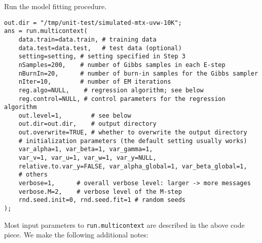 \documentclass[10pt]{article}
\begin{document}
Run the model fitting procedure.
{\small\begin{verbatim}
out.dir = "/tmp/unit-test/simulated-mtx-uvw-10K";
ans = run.multicontext(
    data.train=data.train, # training data
    data.test=data.test,   # test data (optional)
    setting=setting, # setting specified in Step 3
    nSamples=200,    # number of Gibbs samples in each E-step
    nBurnIn=20,      # number of burn-in samples for the Gibbs sampler
    nIter=10,        # number of EM iterations
    reg.algo=NULL,    # regression algorithm; see below
    reg.control=NULL, # control parameters for the regression algorithm
    out.level=1,        # see below
    out.dir=out.dir,    # output directory
    out.overwrite=TRUE, # whether to overwrite the output directory
    # initialization parameters (the default setting usually works)
    var_alpha=1, var_beta=1, var_gamma=1, 
    var_v=1, var_u=1, var_w=1, var_y=NULL,
    relative.to.var_y=FALSE, var_alpha_global=1, var_beta_global=1,
    # others
    verbose=1,      # overall verbose level: larger -> more messages
    verbose.M=2,    # verbose level of the M-step
    rnd.seed.init=0, rnd.seed.fit=1 # random seeds
);
\end{verbatim}}
\noindent Most input parameters to {\tt run.multicontext} are described in the above code piece. We make the following additional notes:
\end{document}
